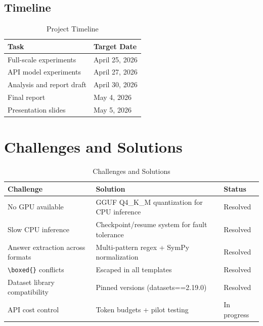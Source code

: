 \documentclass[conference]{IEEEtran}
\begin{document}
\subsection{Timeline}

\begin{table}[h]
\centering
\caption{Project Timeline}
\label{tab:timeline}
\begin{tabular}{ll}
\toprule
\textbf{Task} & \textbf{Target Date} \\
\midrule
Full-scale experiments & April 25, 2026 \\
API model experiments & April 27, 2026 \\
Analysis and report draft & April 30, 2026 \\
Final report & May 4, 2026 \\
Presentation slides & May 5, 2026 \\
\bottomrule
\end{tabular}
\end{table}

\section{Challenges and Solutions}

\begin{table}[h]
\centering
\caption{Challenges and Solutions}
\label{tab:challenges}
\begin{tabular}{lll}
\toprule
\textbf{Challenge} & \textbf{Solution} & \textbf{Status} \\
\midrule
No GPU available & GGUF Q4\_K\_M quantization for CPU inference & Resolved \\
Slow CPU inference & Checkpoint/resume system for fault tolerance & Resolved \\
Answer extraction across formats & Multi-pattern regex + SymPy normalization & Resolved \\
\texttt{\textbackslash boxed\{\}} conflicts & Escaped in all templates & Resolved \\
Dataset library compatibility & Pinned versions (datasets==2.19.0) & Resolved \\
API cost control & Token budgets + pilot testing & In progress \\
\bottomrule
\end{tabular}
\end{table}
\end{document}
